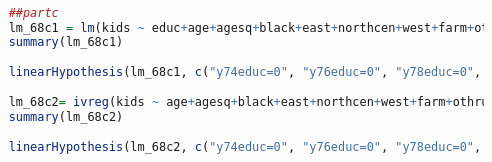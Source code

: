\documentclass[11pt]{article} %
\begin{document}
\begin{lstlisting}[language=R]

    ##partc
    lm_68c1 = lm(kids ~ educ+age+agesq+black+east+northcen+west+farm+othrural+town+smcity+y74+y76+y78+y80+y82+y84+y74educ+y76educ+y78educ+y80educ+y82educ+y84educ, data = FERTIL1)
    summary(lm_68c1)
    
    linearHypothesis(lm_68c1, c("y74educ=0", "y76educ=0", "y78educ=0", "y80educ=0", "y82educ=0", "y84educ=0"))
    
    lm_68c2= ivreg(kids ~ age+agesq+black+east+northcen+west+farm+othrural+town+smcity+educ+y74+y76+y78+y80+y82+y84+y74educ+y76educ+y78educ+y80educ+y82educ+y84educ | age+agesq+black+east+northcen+west+farm+othrural+town+smcity+y74+y76+y78+y80+y82+y84+meduc+feduc+y74meduc+y76meduc+y78meduc+y80meduc+y82meduc+y84meduc+y74feduc+y76feduc+y78feduc+y80feduc+y82feduc+y84feduc, data = FERTIL1)
    summary(lm_68c2)
    
    linearHypothesis(lm_68c2, c("y74educ=0", "y76educ=0", "y78educ=0", "y80educ=0", "y82educ=0", "y84educ=0"))

\end{lstlisting}
\end{document}
